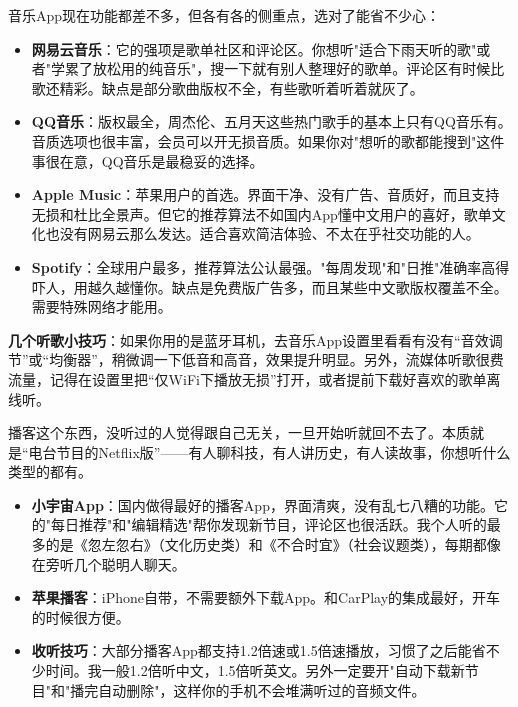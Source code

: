 


音乐App现在功能都差不多，但各有各的侧重点，选对了能省不少心：

\begin{itemize}
  \item \textbf{网易云音乐}：它的强项是歌单社区和评论区。你想听"适合下雨天听的歌"或者"学累了放松用的纯音乐"，搜一下就有别人整理好的歌单。评论区有时候比歌还精彩。缺点是部分歌曲版权不全，有些歌听着听着就灰了。
  \item \textbf{QQ音乐}：版权最全，周杰伦、五月天这些热门歌手的基本上只有QQ音乐有。音质选项也很丰富，会员可以开无损音质。如果你对"想听的歌都能搜到"这件事很在意，QQ音乐是最稳妥的选择。
  \item \textbf{Apple Music}：苹果用户的首选。界面干净、没有广告、音质好，而且支持无损和杜比全景声。但它的推荐算法不如国内App懂中文用户的喜好，歌单文化也没有网易云那么发达。适合喜欢简洁体验、不太在乎社交功能的人。
  \item \textbf{Spotify}：全球用户最多，推荐算法公认最强。"每周发现"和"日推"准确率高得吓人，用越久越懂你。缺点是免费版广告多，而且某些中文歌版权覆盖不全。需要特殊网络才能用。
\end{itemize}

\textbf{几个听歌小技巧}：如果你用的是蓝牙耳机，去音乐App设置里看看有没有“音效调节”或“均衡器”，稍微调一下低音和高音，效果提升明显。另外，流媒体听歌很费流量，记得在设置里把“仅WiFi下播放无损”打开，或者提前下载好喜欢的歌单离线听。


播客这个东西，没听过的人觉得跟自己无关，一旦开始听就回不去了。本质就是“电台节目的Netflix版”——有人聊科技，有人讲历史，有人读故事，你想听什么类型的都有。

\begin{itemize}
  \item \textbf{小宇宙App}：国内做得最好的播客App，界面清爽，没有乱七八糟的功能。它的"每日推荐"和"编辑精选"帮你发现新节目，评论区也很活跃。我个人听的最多的是《忽左忽右》（文化历史类）和《不合时宜》（社会议题类），每期都像在旁听几个聪明人聊天。
  \item \textbf{苹果播客}：iPhone自带，不需要额外下载App。和CarPlay的集成最好，开车的时候很方便。
  \item \textbf{收听技巧}：大部分播客App都支持1.2倍速或1.5倍速播放，习惯了之后能省不少时间。我一般1.2倍听中文，1.5倍听英文。另外一定要开"自动下载新节目"和"播完自动删除"，这样你的手机不会堆满听过的音频文件。
\end{itemize}

